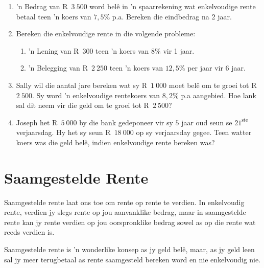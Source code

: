 \begin{exercises}{}
{
    \begin{enumerate}[label=\textbf{\arabic*}.]
	\item ’n Bedrag van R~$3~500$ word belê in ’n spaarrekening wat enkelvoudige rente betaal teen ’n koers van $7,5\%$ p.a. Bereken die eindbedrag na 2 jaar.

	\item Bereken die enkelvoudige rente in die volgende probleme:
	\begin{enumerate}
	    \item ’n Lening van R~$300$  teen ’n koers van $8\%$ vir 1 jaar.

	    \item ’n Belegging van R~$2~250$ teen ’n koers van $12,5\%$ per jaar vir 6 jaar.
	\end{enumerate}

	\item Sally wil die aantal jare bereken wat sy R~$1~000$ moet bel\^e om te groei tot R~$2~500$. Sy word 'n enkelvoudige rentekoers van $8,2\%$ p.a aangebied. Hoe lank sal dit neem vir die geld om te groei tot R~$2~500$?
	\item Joseph het R~$5~000$ by die bank gedeponeer vir sy $5$ jaar oud seun se $21^{\mathrm{ste}}$ verjaarsdag. Hy het sy seun R~$18~000$ op sy verjaarsday gegee. Teen watter koers was die geld belê, indien enkelvoudige rente bereken was?
    \end{enumerate}

}
\end{exercises}






\section{Saamgestelde Rente}

Saamgestelde rente laat ons toe om rente op rente te verdien. In enkelvoudig rente, verdien jy slegs rente op jou aanvanklike bedrag, maar in saamgestelde rente kan jy rente verdien op jou oorspronklike bedrag sowel as op die rente wat reeds verdien is.\par

Saamgestelde rente is 'n wonderlike konsep as jy geld bel\^e, maar, as jy geld leen sal jy meer terugbetaal as rente saamgesteld bereken word en nie enkelvoudig nie.



